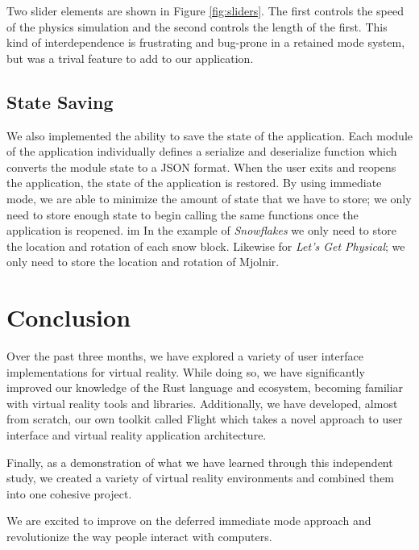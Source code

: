 \documentclass[conference,12pt]{IEEEtran}
\begin{document}
Two slider elements are shown in Figure \ref{fig:sliders}. The first controls
the speed of the physics simulation and the second controls the length of the
first. This kind of interdependence is frustrating and bug-prone in a retained
mode system, but was a trival feature to add to our application.

\subsection{State Saving}

We also implemented the ability to save the state of the application. Each
module of the application individually defines a serialize and deserialize
function which converts the module state to a JSON format. When the user exits
and reopens the application, the state of the application is restored. By using
immediate mode, we are able to minimize the amount of state that we have to
store; we only need to store enough state to begin calling the same functions
once the application is reopened.
im
In the example of \textit{Snowflakes} we only need to store the location and
rotation of each snow block. Likewise for \textit{Let's Get Physical}; we only
need to store the location and rotation of Mjolnir.

\section{Conclusion}\label{sec:conclusion}

Over the past three months, we have explored a variety of user interface
implementations for virtual reality. While doing so, we have significantly
improved our knowledge of the Rust language and ecosystem, becoming familiar
with virtual reality tools and libraries. Additionally, we have developed,
almost from scratch, our own toolkit called Flight which takes a novel approach
to user interface and virtual reality application architecture.

Finally, as a demonstration of what we have learned through this independent
study, we created a variety of virtual reality environments and combined them
into one cohesive project.

We are excited to improve on the deferred immediate mode approach and
revolutionize the way people interact with computers.

{\printbibliography}
\end{document}
